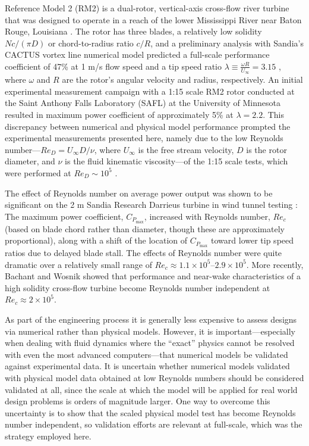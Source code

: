 \documentclass[10pt,letterpaper]{article}
\begin{document}
Reference Model 2 (RM2) is a dual-rotor, vertical-axis cross-flow river turbine
that was designed to operate in a reach of the lower Mississippi River near
Baton Rouge, Louisiana \cite{Barone2011, Neary2011}. The rotor has three blades,
a relatively low solidity $Nc/(\pi D)$ or chord-to-radius ratio $c/R$, and a
preliminary analysis with Sandia's CACTUS vortex line numerical model
\cite{Murray2011} predicted a full-scale performance coefficient of 47\% at 1
m/s flow speed and a tip speed ratio $\lambda \equiv \frac{\omega R}{U_\infty} =
3.15$ \cite{Barone2011}, where $\omega$ and $R$ are the rotor's angular velocity
and radius, respectively. An initial experimental measurement campaign with a
1:15 scale RM2 rotor conducted at the Saint Anthony Falls Laboratory (SAFL) at
the University of Minnesota resulted in maximum power coefficient of
approximately 5\% at $\lambda = 2.2$. This discrepancy between numerical and
physical model performance prompted the experimental measurements presented
here, namely due to the low Reynolds number---$Re_D = U_\infty D / \nu$, where
$U_\infty$ is the free stream velocity, $D$ is the rotor diameter, and $\nu$ is
the fluid kinematic viscosity---of the 1:15 scale tests, which were performed at
$Re_D \sim 10^5$ \cite{Hill2014}.

The effect of Reynolds number on average power output was shown to be
significant on the 2 m Sandia Research Darrieus turbine in wind tunnel testing
\cite{Blackwell1976}: The maximum power coefficient, $C_{P_{\max}}$, increased
with Reynolds number, $Re_c$ (based on blade chord rather than diameter, though
these are approximately proportional), along with a shift of the location of
$C_{P_{\max}}$ toward lower tip speed ratios due to delayed blade stall. The
effects of Reynolds number were quite dramatic over a relatively small range of
$Re_c \approx 1.1 \times 10^5$--$2.9 \times 10^5$. More recently, Bachant and
Wosnik \cite{Bachant2014, Bachant2016-RVAT-Re-dep} showed that performance and
near-wake characteristics of a high solidity cross-flow turbine become Reynolds
number independent at $Re_c \approx 2 \times 10^5$.

As part of the engineering process it is generally less expensive to assess
designs via numerical rather than physical models. However, it is
important---especially when dealing with fluid dynamics where the ``exact''
physics cannot be resolved with even the most advanced computers---that
numerical models be validated against experimental data. It is uncertain whether
numerical models validated with physical model data obtained at low Reynolds
numbers should be considered validated at all, since the scale at which the
model will be applied for real world design problems is orders of magnitude
larger. One way to overcome this uncertainty is to show that the scaled physical
model test has become Reynolds number independent, so validation efforts are
relevant at full-scale, which was the strategy employed here.
\end{document}

